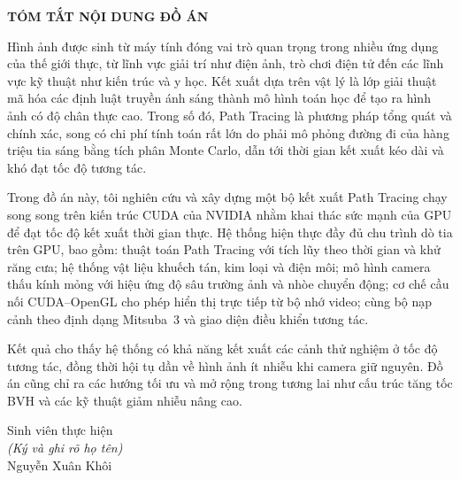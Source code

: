 \thispagestyle{empty}
\begin{center}
{\Large\bfseries TÓM TẮT NỘI DUNG ĐỒ ÁN}
\end{center}
\vspace{1cm}

Hình ảnh được sinh từ máy tính đóng vai trò quan trọng trong nhiều ứng dụng của
thế giới thực, từ lĩnh vực giải trí như điện ảnh, trò chơi điện tử đến các lĩnh
vực kỹ thuật như kiến trúc và y học. Kết xuất dựa trên vật lý là lớp giải thuật
mã hóa các định luật truyền ánh sáng thành mô hình
toán học để tạo ra hình ảnh có độ chân thực cao. Trong số đó, Path Tracing là
phương pháp tổng quát và chính xác, song có chi phí tính toán rất lớn do phải mô
phỏng đường đi của hàng triệu tia sáng bằng tích phân Monte Carlo, dẫn tới thời
gian kết xuất kéo dài và khó đạt tốc độ tương tác.

Trong đồ án này, tôi nghiên cứu và xây dựng một bộ kết xuất Path Tracing chạy
song song trên kiến trúc CUDA của NVIDIA nhằm khai thác sức mạnh của GPU để đạt
tốc độ kết xuất thời gian thực. Hệ thống hiện thực đầy đủ chu trình dò tia trên
GPU, bao gồm: thuật toán Path Tracing với tích lũy theo thời gian và khử răng
cưa; hệ thống vật liệu khuếch tán, kim loại và điện môi; mô hình camera thấu kính
mỏng với hiệu ứng độ sâu trường ảnh và nhòe chuyển động; cơ chế cầu nối
CUDA--OpenGL cho phép hiển thị trực tiếp từ bộ nhớ video; cùng bộ nạp cảnh theo
định dạng Mitsuba~3 và giao diện điều khiển tương tác.

Kết quả cho thấy hệ thống có khả năng kết xuất các cảnh thử nghiệm ở tốc độ
tương tác, đồng thời hội tụ dần về hình ảnh ít nhiễu khi camera giữ nguyên. Đồ án
cũng chỉ ra các hướng tối ưu và mở rộng trong tương lai như cấu trúc tăng tốc BVH
và các kỹ thuật giảm nhiễu nâng cao.

\vspace{1.5cm}
\begin{flushright}
Sinh viên thực hiện\\[0.3cm]
\textit{(Ký và ghi rõ họ tên)}\\[1.2cm]
Nguyễn Xuân Khôi
\end{flushright}
